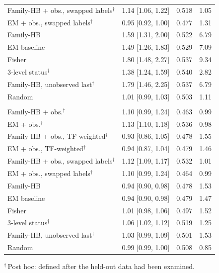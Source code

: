 \begin{table}[htbp]
\begin{tabular}{@{}lccc@{}}
Family-HB + obs., swapped labels$^{\dagger}$ & 1.14 [1.06, 1.22] & 0.518 & 1.05 \\
EM + obs., swapped labels$^{\dagger}$ & 0.95 [0.92, 1.00] & 0.477 & 1.31 \\
Family-HB & 1.59 [1.31, 2.00] & 0.522 & 6.79 \\
EM baseline & 1.49 [1.26, 1.83] & 0.529 & 7.09 \\
Fisher & 1.80 [1.48, 2.27] & 0.537 & 9.34 \\
3-level status$^{\dagger}$ & 1.38 [1.24, 1.59] & 0.540 & 2.82 \\
Family-HB, unobserved last$^{\dagger}$ & 1.79 [1.46, 2.25] & 0.537 & 6.79 \\
Random & 1.01 [0.99, 1.03] & 0.503 & 1.11 \\
\addlinespace[3pt]
\multicolumn{4}{@{}l}{\emph{Pooled perturbation}} \\
Family-HB + obs.$^{\dagger}$ & 1.10 [0.99, 1.24] & 0.463 & 0.99 \\
EM + obs.$^{\dagger}$ & 1.13 [1.10, 1.18] & 0.536 & 0.98 \\
Family-HB + obs., TF-weighted$^{\dagger}$ & 0.93 [0.86, 1.05] & 0.478 & 1.55 \\
EM + obs., TF-weighted$^{\dagger}$ & 0.94 [0.87, 1.04] & 0.479 & 1.46 \\
Family-HB + obs., swapped labels$^{\dagger}$ & 1.12 [1.09, 1.17] & 0.532 & 1.01 \\
EM + obs., swapped labels$^{\dagger}$ & 1.10 [0.99, 1.24] & 0.464 & 0.99 \\
Family-HB & 0.94 [0.90, 0.98] & 0.478 & 1.53 \\
EM baseline & 0.94 [0.90, 0.98] & 0.479 & 1.47 \\
Fisher & 1.01 [0.98, 1.06] & 0.497 & 1.52 \\
3-level status$^{\dagger}$ & 1.06 [1.02, 1.12] & 0.519 & 1.25 \\
Family-HB, unobserved last$^{\dagger}$ & 1.03 [0.99, 1.09] & 0.501 & 1.53 \\
Random & 0.99 [0.99, 1.00] & 0.508 & 0.85 \\
\bottomrule
\end{tabular}
\par\smallskip
\begin{minipage}{\linewidth}\footnotesize
$^{\dagger}$\,Post hoc: defined after the held-out data had been examined.
\end{minipage}
\end{table}
